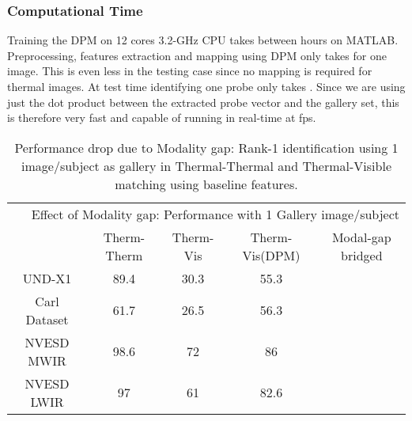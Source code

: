 \documentclass[smallextended,natbib]{svjour3}       \usepackage{graphicx}
\begin{document}
\subsubsection{Computational Time}
Training the DPM on 12 cores 3.2-GHz CPU takes between  hours on MATLAB. Preprocessing, features extraction and mapping using DPM only takes  for one image. This is even less in the testing case since no mapping is required for thermal images. At test time identifying one probe only takes . Since we are using just the dot product between the extracted probe vector and the gallery set, this is therefore very fast and capable of running in real-time at  fps.

\begin{table}[t]
\centering
\begin{tabular}{@{}ccccc@{}}
\toprule
\multicolumn{5}{r}{Effect of Modality gap: Performance with 1 Gallery image/subject} \\ \cmidrule(l){2-5}
&Therm-Therm   & Therm-Vis  & Therm-Vis(DPM)  & Modal-gap bridged  \\ 
\midrule
 UND-X1 		&89.4             & 30.3            & 55.3                       &                \\
 Carl Dataset 	&61.7             & 26.5            & 56.3                       &                \\
NVESD MWIR 	&98.6             & 72            & 86                       &                \\
NVESD LWIR 	&97             & 61            & 82.6                       &                 
\end{tabular}
\caption{Performance drop due to Modality gap: Rank-1 identification using 1 image/subject as gallery in Thermal-Thermal and Thermal-Visible matching using baseline features.}

\label{table:modgap}
\end{table}
\end{document}
